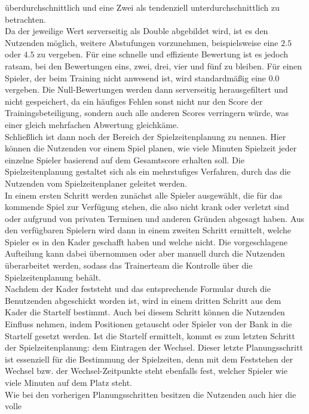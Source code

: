 überdurchschnittlich und eine Zwei als tendenziell unterdurchschnittlich zu 
betrachten. \\ 
Da der jeweilige Wert serverseitig als Double abgebildet wird, ist es den Nutzenden 
möglich, weitere Abstufungen vorzunehmen, beispielsweise eine $ 2.5 $ oder 
$ 4.5 $ zu vergeben. Für eine schnelle und effiziente Bewertung ist es jedoch 
ratsam, bei den Bewertungen eins, zwei, drei, vier und fünf zu bleiben. Für einen 
Spieler, der beim Training nicht anwesend ist, wird standardmäßig eine $ 0.0 $ 
vergeben. Die Null-Bewertungen werden dann serverseitig herausgefiltert und 
nicht gespeichert, da ein häufiges Fehlen sonst nicht nur den Score der 
Trainingsbeteiligung, sondern auch alle anderen Scores verringern würde, was einer 
gleich mehrfachen Abwertung gleichkäme. \\ 
Schließlich ist dann noch der Bereich der Spielzeitenplanung zu nennen. Hier können 
die Nutzenden vor einem Spiel planen, wie viele Minuten Spielzeit jeder einzelne 
Spieler basierend auf dem Gesamtscore erhalten soll. Die Spielzeitenplanung 
gestaltet sich als ein mehrstufiges Verfahren, durch das die Nutzenden vom 
Spielzeitenplaner geleitet werden. \\ 
In einem ersten Schritt werden zunächst alle Spieler ausgewählt, die für das 
kommende Spiel zur Verfügung stehen, die also nicht krank oder verletzt sind oder 
aufgrund von privaten Terminen und anderen Gründen abgesagt haben. Aus den 
verfügbaren Spielern wird dann in einem zweiten Schritt ermittelt, welche Spieler 
es in den Kader geschafft haben und welche nicht. Die vorgeschlagene Aufteilung 
kann dabei übernommen oder aber manuell durch die Nutzenden überarbeitet werden, 
sodass das Trainerteam die Kontrolle über die Spielzeitenplanung behält. \\ 
Nachdem der Kader feststeht und das entsprechende Formular durch die Benutzenden 
abgeschickt worden ist, wird in einem dritten Schritt aus dem Kader die Startelf 
bestimmt. Auch bei diesem Schritt können die Nutzenden Einfluss nehmen, indem 
Positionen getauscht oder Spieler von der Bank in die Startelf gesetzt werden. Ist 
die Startelf ermittelt, kommt es zum letzten Schritt der Spielzeitenplanung: 
dem Eintragen der Wechsel. Dieser letzte Planungsschritt ist essenziell für die 
Bestimmung der Spielzeiten, denn mit dem Feststehen der Wechsel bzw. der 
Wechsel-Zeitpunkte steht ebenfalls fest, welcher Spieler wie viele Minuten auf dem 
Platz steht. \\ 
Wie bei den vorherigen Planungsschritten besitzen die Nutzenden auch hier die volle 
